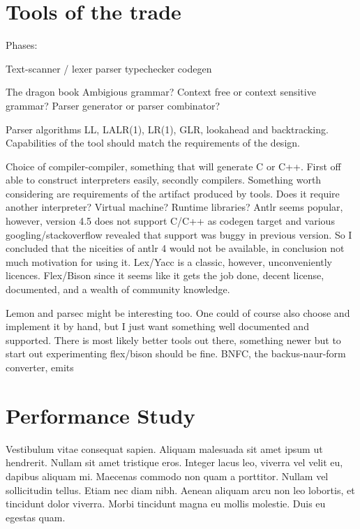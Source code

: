 \documentclass{sigplanconf}
\begin{document}
\section{Tools of the trade}

Phases:

Text-scanner / lexer
parser
typechecker
codegen


The dragon book
Ambigious grammar?
Context free or context sensitive grammar?
Parser generator or parser combinator?

Parser algorithms LL, LALR(1), LR(1), GLR, lookahead and backtracking.
Capabilities of the tool should match the requirements of the design.

Choice of compiler-compiler, something that will generate C or C++. First off able to construct interpreters easily, secondly compilers. Something worth considering are requirements of the artifact produced by tools. Does it require another interpreter? Virtual machine? Runtime libraries?  Antlr\cite{cc:antlr} seems popular, however, version 4.5 does not support C/C++ as codegen target and various googling/stackoverflow revealed that support was buggy in previous version. So I concluded that the niceities of antlr 4 would not be available, in conclusion not much motivation for using it. Lex\cite{cc:lex}/Yacc\cite{cc:yacc} is a classic, however, unconveniently licences. Flex/Bison since it seems like it gets the job done, decent license, documented, and a wealth of community knowledge.

Lemon\cite{cc:lemon} and parsec\cite{cc:parsec} might be interesting too.  One could of course also choose and implement it by hand, but I just want something well documented and supported. There is most likely better tools out there, something newer but to start out experimenting flex/bison should be fine. BNFC, the backus-naur-form converter, emits 

\section{Performance Study}

Vestibulum vitae consequat sapien. Aliquam malesuada sit amet ipsum ut hendrerit. Nullam sit amet tristique eros. Integer lacus leo, viverra vel velit eu, dapibus aliquam mi. Maecenas commodo non quam a porttitor. Nullam vel sollicitudin tellus. Etiam nec diam nibh. Aenean aliquam arcu non leo lobortis, et tincidunt dolor viverra. Morbi tincidunt magna eu mollis molestie. Duis eu egestas quam.
\end{document}
